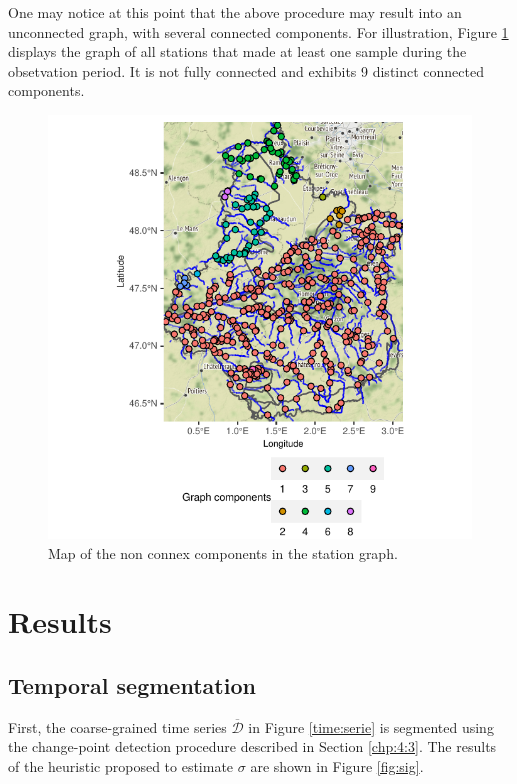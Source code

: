 One may notice at this point that the above procedure may result into an unconnected graph, with several connected components. For illustration, Figure \ref{fig:comp} displays the graph of all stations that made at least one sample during the obsetvation period. It is not fully connected and exhibits 9 distinct connected components.  

\begin{figure}[ht]
  \centering
  \includegraphics[]{figs/Chap5/Graph_comp-1.pdf}
  \caption{Map of the non connex components in the station graph.}
  \label{fig:comp}
\end{figure}

\section{Results}\label{section:results}

\subsection{Temporal segmentation}\label{sec:time_pattern}

First, the coarse-grained time series $\overline{\mathcal{D}}$ in Figure \ref{time:serie} is segmented using the change-point detection procedure described in Section \ref{chp:4:3}. The results of the heuristic proposed to estimate $\sigma$ are shown in Figure \ref{fig:sig}.

